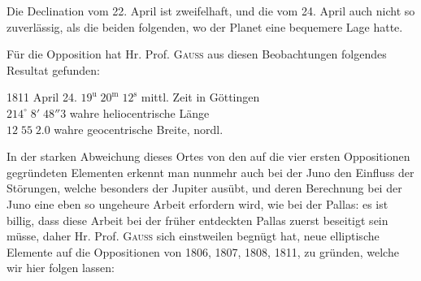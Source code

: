 \par\indent Die Declination vom 22. April ist zweifelhaft, und die vom 24. April auch nicht so zuverlässig, als die beiden folgenden, wo der Planet eine bequemere Lage hatte.

\par\indent Für die Opposition hat Hr. Prof. \textsc{Gauss} aus diesen Beobachtungen folgendes Resultat gefunden:
\begin{center}1811 April 24. $19^{\text{u}}\;20^{\text{m}}\;12^{\text{s}}$ mittl. Zeit in Göttingen\\$214^\circ\;8'\;48''3$ wahre heliocentrische Länge\\$12\;55\;2.0$ wahre geocentrische Breite, nordl.\end{center}
\par\indent In der starken Abweichung dieses Ortes von den auf die vier ersten Oppositionen gegründeten Elementen erkennt man nunmehr auch bei der Juno den Einfluss der Störungen, welche besonders der Jupiter ausübt, und deren Berechnung bei der Juno eine eben so ungeheure Arbeit erfordern wird, wie bei der Pallas: es ist billig, dass diese Arbeit bei der früher entdeckten Pallas zuerst beseitigt sein müsse, daher Hr. Prof. \textsc{Gauss} sich einstweilen begnügt hat, neue elliptische Elemente auf die Oppositionen von 1806, 1807, 1808, 1811, zu gründen, welche wir hier folgen lassen:

